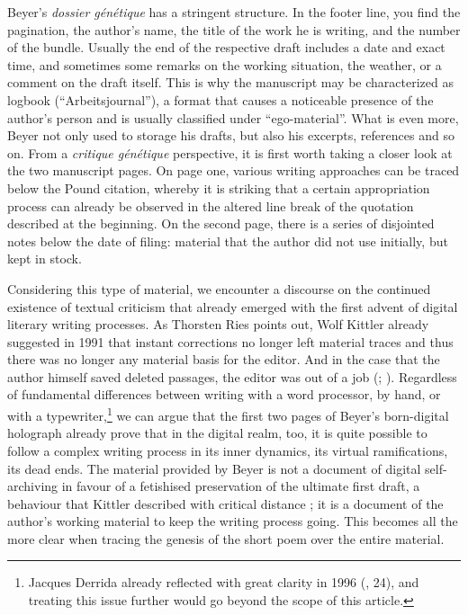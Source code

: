 \documentclass{article}
\begin{document}
Beyer's \emph{dossier génétique} has a stringent structure. In the
footer line, you find the pagination, the author's name, the title of
the work he is writing, and the number of the bundle. Usually the
end of the respective draft includes a date and exact time, and
sometimes some remarks on the working situation, the weather, or a
comment on the draft itself. This is why the manuscript may be
characterized as logbook (``Arbeitsjournal''), a format that causes a
noticeable presence of the author's person and is usually classified
under ``ego-material''. What is even more, Beyer not only used to storage his drafts, but also his excerpts, references and so on. From a
\emph{critique génétique} perspective, it is first worth taking a closer
look at the two manuscript pages. On page one, various writing
approaches can be traced below the Pound citation, whereby it is
striking that a certain appropriation process can already be observed in
the altered line break of the quotation described at the beginning. On
the second page, there is a series of disjointed notes below the date of
filing: material that the author did not use initially, but kept in
stock.

Considering this type of material, we encounter a discourse on the
continued existence of textual criticism that already emerged with the
first advent of digital literary writing processes. As Thorsten Ries points out,
Wolf Kittler already suggested in 1991 that instant corrections no longer left material traces and thus there was no longer
any material basis for the editor. And in the case that the author
himself saved deleted passages, the editor was out of a job 
(\cite[235]{kittler_literatur_1991};  \cite[129]{ries_philology_2017}). Regardless of fundamental differences
between writing with a word processor, by hand, or with a typewriter,\footnote{Jacques Derrida already reflected with great clarity in 1996 (\cite{derrida_paper_2005}, 24), and treating this issue further would go beyond the scope of
this article.} we can argue that the first two pages of Beyer's born-digital
holograph already prove that in the digital realm, too, it is quite
possible to follow a complex writing process in its inner dynamics, its
virtual ramifications, its dead ends. The material provided by Beyer is
not a document of digital self-archiving in favour of a fetishised
preservation of the ultimate first draft, a behaviour that Kittler
described with critical distance \citep[130]{ries_philology_2017}; it is a document of
the author's working material to keep the writing process going. This
becomes all the more clear when tracing the genesis of the short poem
over the entire material.
\end{document}
